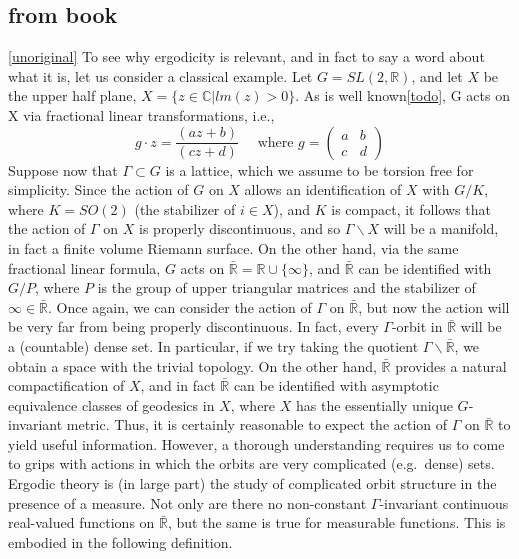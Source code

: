 \documentclass[
]{article}
\begin{document}
\hypertarget{from-book}{%
\subsection{from book}\label{from-book}}

\href{Zimmer\%20p.4}{{[}unoriginal{]}} To see why ergodicity is
relevant, and in fact to say a word about what it is, let us consider a
classical example. Let \(G = SL(2, \mathbb{R})\), and let \(X\) be the
upper half plane, \(X= \{z \in \mathbb{C} | lm(z) > 0\}\). As is well
known\href{upper\%20half\%20plane,\%20möbius\%20transforms,\%20give\%20reference\%20to\%20misc\%20things.\%20and\%20figure\%20out\%20what\%20the\%20actual\%20example\%20is.\%20figure\%20out\%20what\%20the\%20theorem\%20tries\%20to\%20answer.}{{[}todo{]}},
G acts on X via fractional linear transformations, i.e., \[
g \cdot z=\frac{(az+b)}{(cz+d)}
\quad
\text{ where }g=
\begin{pmatrix}a & b \\ c & d\end{pmatrix}
\] Suppose now that \(\Gamma \subset G\) is a lattice, which we assume
to be torsion free for simplicity. Since the action of \(G\) on \(X\)
allows an identification of \(X\) with \(G/K\), where \(K = SO(2)\) (the
stabilizer of \(i \in X\)), and \(K\) is compact, it follows that the
action of \(\Gamma\) on \(X\) is properly discontinuous, and so
\(\Gamma\backslash X\) will be a manifold, in fact a finite volume
Riemann surface. On the other hand, via the same fractional linear
formula, \(G\) acts on
\(\bar{\mathbb{R}} = \mathbb{R} \cup \{ \infty \}\), and
\(\bar{\mathbb{R}}\) can be identified with \(G/P\), where \(P\) is the
group of upper triangular matrices and the stabilizer of
\(\infty \in \bar{\mathbb{R}}\). Once again, we can consider the action
of \(\Gamma\) on \(\bar{\mathbb{R}}\), but now the action will be very
far from being properly discontinuous. In fact, every \(\Gamma\)-orbit
in \(\bar{\mathbb{R}}\) will be a (countable) dense set. In particular,
if we try taking the quotient \(\Gamma\backslash\bar{\mathbb{R}}\), we
obtain a space with the trivial topology. On the other hand,
\(\bar{\mathbb{R}}\) provides a natural compactification of \(X\), and
in fact \(\bar{\mathbb{R}}\) can be identified with asymptotic
equivalence classes of geodesics in \(X\), where \(X\) has the
essentially unique \(G\)-invariant metric. Thus, it is certainly
reasonable to expect the action of \(\Gamma\) on \(\bar{\mathbb{R}}\) to
yield useful information. However, a thorough understanding requires us
to come to grips with actions in which the orbits are very complicated
(e.g.~dense) sets. Ergodic theory is (in large part) the study of
complicated orbit structure in the presence of a measure. Not only are
there no non-constant \(\Gamma\)-invariant continuous real-valued
functions on \(\bar{\mathbb{R}}\), but the same is true for measurable
functions. This is embodied in the following definition.
\end{document}
